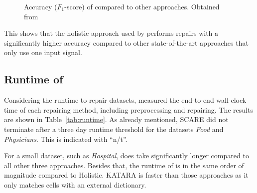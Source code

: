   \begin{figure}
    \centering
    
    \caption{Accuracy ($F_1$-score) of \holoclean{} compared to other approaches. Obtained from~\cite{holoclean}}
    \label{fig:accuracy}
  \end{figure}

  This shows that the holistic approach used by \holoclean{} performs repairs with a significantly higher accuracy compared to other state-of-the-art approaches that only use one input signal.

  \subsection{Runtime of \holoclean{}}
  Considering the runtime to repair datasets, \citeauthor{holoclean} measured the end-to-end wall-clock time of each repairing method, including preprocessing and repairing.
  The results are shown in Table~\ref{tab:runtime}.
  As already mentioned, SCARE did not terminate after a three day runtime threshold for the datasets \textit{Food} and \textit{Physicians}.
  This is indicated with \enquote{n/t}.

  \begin{table}
    \caption{Runtime of \holoclean{} compared to other approaches. Obtained from~\cite{holoclean}}
    \label{tab:runtime}
  \end{table}

  For a small dataset, such as \textit{Hospital}, \holoclean{} does take significantly longer compared to all other three approaches.
  Besides that, the runtime of \holoclean{} is in the same order of magnitude compared to Holistic.
  KATARA is faster than those approaches as it only matches cells with an external dictionary.

